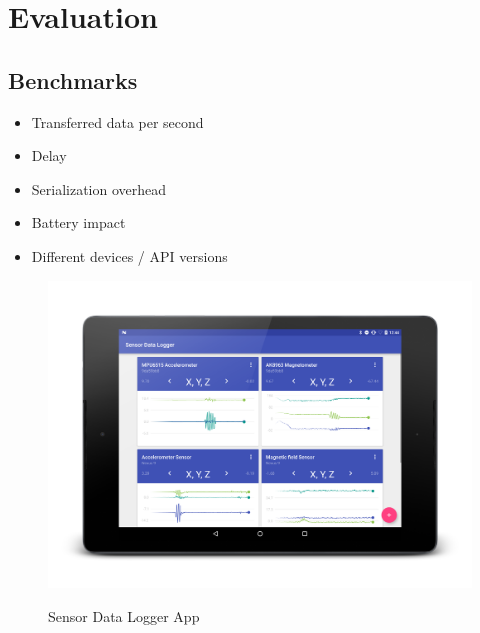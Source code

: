 \section{Evaluation}
\label{sec:evaluation}

\subsection{Benchmarks}
\begin{itemize}[noitemsep]
	\item Transferred data per second
	\item Delay
	\item Serialization overhead
	\item Battery impact
	\item Different devices / API versions
\end{itemize}

\begin{figure}
	\href{https://github.com/Steppschuh/Sensor-Data-Logger}{
		\includegraphics[width=\linewidth]{images/app/charts_portrait_framed.png}
	}
	\caption[Caption for Sensor Data Logger App]{Sensor Data Logger App\footnotemark}
	\label{fig:sensorDataLoggerApp}
\end{figure}


\lipsum[1]
\lipsum[2]
\lipsum[3]
\lipsum[4]
\lipsum[5]
\lipsum[1]
\lipsum[2]
\lipsum[3]
\lipsum[4]
\lipsum[5]


\clearpage